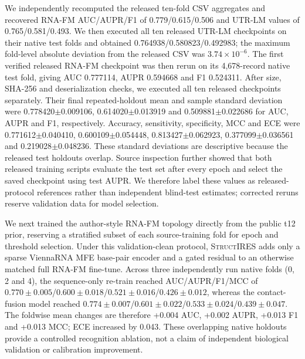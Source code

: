 We independently recomputed the released ten-fold CSV aggregates and recovered RNA-FM
AUC/AUPR/F1 of 0.779/0.615/0.506 and UTR-LM values of 0.765/0.581/0.493. We then executed all ten
released UTR-LM checkpoints on their native test folds and obtained 0.764938/0.580823/0.492983;
the maximum fold-level absolute deviation from the released CSV was $3.74\times10^{-6}$. The first
verified released RNA-FM checkpoint was then rerun on its 4,678-record native test fold, giving
AUC 0.777114, AUPR 0.594668 and F1 0.524311. After size, SHA-256 and deserialization checks, we
executed all ten released checkpoints separately. Their final repeated-holdout mean and sample
standard deviation were 0.778420$\pm$0.009106, 0.614020$\pm$0.013919 and
0.509881$\pm$0.022686 for AUC, AUPR and F1, respectively. Accuracy, sensitivity, specificity,
MCC and ECE were 0.771612$\pm$0.040410, 0.600109$\pm$0.054448,
0.813427$\pm$0.062923, 0.377099$\pm$0.036561 and 0.219028$\pm$0.048236. These
standard deviations are descriptive because the released test holdouts overlap. Source inspection
further showed that both
released training scripts evaluate the test set after every epoch and select the saved checkpoint
using test AUPR. We therefore label these values as released-protocol references rather than
independent blind-test estimates; corrected reruns reserve validation data for model selection.

We next trained the author-style RNA-FM topology directly from the public t12 prior, reserving a
stratified subset of each source-training fold for epoch and threshold selection.  Under this
validation-clean protocol, \textsc{StructIRES} adds only a sparse ViennaRNA MFE base-pair encoder
and a gated residual to an otherwise matched full RNA-FM fine-tune.  Across three independently
run native folds (0, 2 and 4), the sequence-only re-train reached AUC/AUPR/F1/MCC of
$0.770\pm0.005$/$0.600\pm0.018$/$0.521\pm0.016$/$0.426\pm0.012$, whereas the contact-fusion
model reached $0.774\pm0.007$/$0.601\pm0.022$/$0.533\pm0.024$/$0.439\pm0.047$.
The foldwise mean changes are therefore +0.004 AUC, +0.002 AUPR, +0.013 F1 and +0.013 MCC; ECE
increased by 0.043.  These overlapping native holdouts provide a controlled recognition ablation,
not a claim of independent biological validation or calibration improvement.

